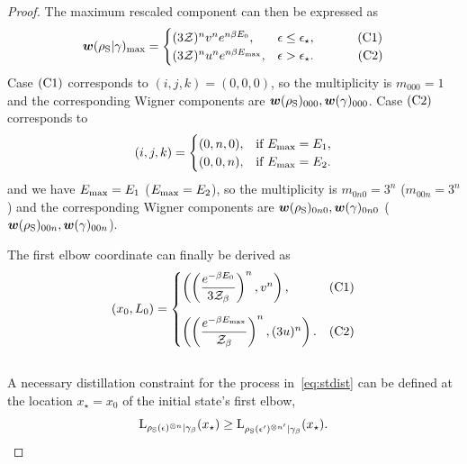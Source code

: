\documentclass[pra,
aps,
twocolumn,
superscriptaddress,
groupedaddress,
nofootinbib,
reprint
]{revtex4-1}
\begin{document}
\begin{proof}
The maximum rescaled component can then be expressed as
\begin{equation*}
\bm{w}(\rho_{\rm{S}} | \gamma)_{\rm{max}} =
	\begin{cases}
		(3\mathcal{Z})^{n} v^n e^{n\beta E_0}, &\epsilon \leq \epsilon_{\star},\ \hspace{30pt}\rm{(C1)}	\\
		(3\mathcal{Z})^{n} u^n e^{n\beta E_{\rm{max}}}, &\epsilon > \epsilon_{\star}.\ \hspace{32pt}\rm{(C2)} 
	\end{cases}
\end{equation*}
Case $\rm{(C1)}$ corresponds to $(i,j,k) = (0,0,0)$, so the multiplicity is $m_{000} = 1$ and the corresponding Wigner components are $\bm{w}(\rho_{\rm{S}})_{000}, \bm{w}(\gamma)_{000}$. 
Case $\rm{(C2)}$ corresponds to
\begin{equation}
	(i,j,k) = 
	\begin{cases}
	(0,n,0), &\text{if } E_{\rm{max}} = E_1, \\
	(0,0,n), &\text{if } E_{\rm{max}} = E_2.
	\end{cases}
\end{equation}
and we have $E_{\rm{max}} = E_1$ ($E_{\rm{max}} = E_2$), so the multiplicity is $m_{0n0} = 3^n$ ($m_{00n} = 3^n$) and the corresponding Wigner components are $\bm{w}(\rho_{\rm{S}})_{0n0}, \bm{w}(\gamma)_{0n0}$ ($\bm{w}(\rho_{\rm{S}})_{00n}, \bm{w}(\gamma)_{00n}$).

The first elbow coordinate can finally be derived as
\begin{equation}\label{eq:first_elb_coords}
	(x_0, L_0) =
	\begin{cases}
		\left( \left(\dfrac{e^{-\beta E_0}}{3\Z_\beta}\right)^n, v^n \right), &\rm{(C1)}	\vspace{10pt}\\
		\left( \left(\dfrac{e^{-\beta E_{\rm{max}}}}{\Z_\beta}\right)^n, (3u)^n \right). &\rm{(C2)} 
	\end{cases}
\end{equation}
\null\\

A necessary distillation constraint for the process in~\cref{eq:stdist} can be defined at the location $x_\star = x_0$ of the initial state's first elbow,
\begin{equation}\label{eq:first_elbow_constraint}
	{{\rm{L}}_{\rho_{\rm{S}}(\epsilon)^{\otimes n}|\gamma_\beta}}(x_\star) \geq {{\rm{L}}_{\rho_{\rm{S}}(\epsilon')^{\otimes n'}|\gamma_\beta}}(x_\star).
\end{equation}


\end{proof}
\end{document}
